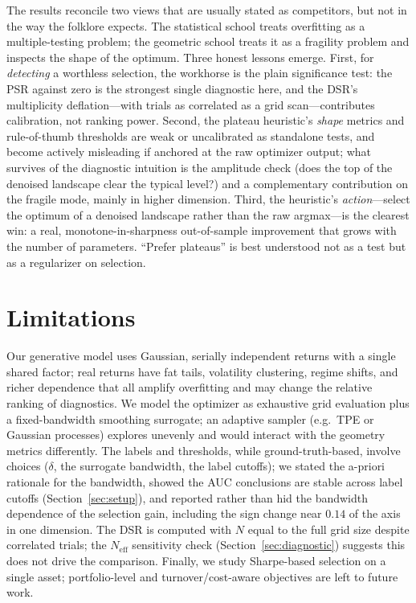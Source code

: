 \documentclass[11pt]{article}
\begin{document}
The results reconcile two views that are usually stated as competitors, but not
in the way the folklore expects. The statistical school treats overfitting as a
multiple-testing problem; the geometric school treats it as a fragility problem
and inspects the shape of the optimum. Three honest lessons emerge. First, for
\emph{detecting} a worthless selection, the workhorse is the plain significance
test: the PSR against zero is the strongest single diagnostic here, and the
DSR's multiplicity deflation---with trials as correlated as a grid
scan---contributes calibration, not ranking power. Second, the plateau
heuristic's \emph{shape} metrics and rule-of-thumb thresholds are weak or
uncalibrated as standalone tests, and become actively misleading if anchored at
the raw optimizer output; what survives of the diagnostic intuition is the
amplitude check (does the top of the denoised landscape clear the typical
level?) and a complementary contribution on the fragile mode, mainly in higher
dimension. Third, the heuristic's \emph{action}---select the optimum of a
denoised landscape rather than the raw argmax---is the clearest win: a real,
monotone-in-sharpness out-of-sample improvement that grows with the number of
parameters. ``Prefer plateaus'' is best understood not as a test but as a
regularizer on selection.

\section{Limitations}

Our generative model uses Gaussian, serially independent returns with a single
shared factor; real returns have fat tails, volatility clustering, regime
shifts, and richer dependence that all amplify overfitting and may change the
relative ranking of diagnostics. We model the optimizer as exhaustive grid
evaluation plus a fixed-bandwidth smoothing surrogate; an adaptive sampler
(e.g.\ TPE or Gaussian processes) explores unevenly and would interact with the
geometry metrics differently. The labels and thresholds, while
ground-truth-based, involve choices ($\delta$, the surrogate bandwidth, the
label cutoffs); we stated the a-priori rationale for the bandwidth, showed the
AUC conclusions are stable across label cutoffs (Section~\ref{sec:setup}), and
reported rather than hid the bandwidth dependence of the selection gain,
including the sign change near $0.14$ of the axis in one dimension. The DSR is
computed with $N$ equal to the full grid size despite correlated trials; the
$N_{\text{eff}}$ sensitivity check (Section~\ref{sec:diagnostic}) suggests this
does not drive the comparison. Finally, we study Sharpe-based selection on a
single asset; portfolio-level and turnover/cost-aware objectives are left to
future work.
\end{document}
